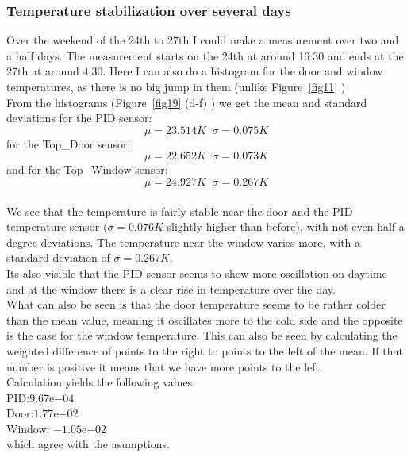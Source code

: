 \documentclass[12pt]{scrartcl}
\begin{document}
      \subsubsection{Temperature stabilization over several days}
      Over the weekend of the 24th to 27th I could make a measurement over two
      and a half days. The measurement starts on the 24th at around 16:30 and
      ends at the 27th at around 4:30. Here I can also do a histogram for the
      door and window temperatures, as there is no big jump in them (unlike
      Figure~\ref{fig11} )\\
      From the histograms (Figure~\ref{fig19} (d-f) ) we get the mean and standard deviations for the PID
      sensor: $$\mu = 23.514K \;\; \sigma = 0.075K$$
      for the Top\_Door sensor: $$\mu = 22.652K \;\; \sigma = 0.073K$$
      and for the Top\_Window sensor: $$\mu = 24.927K \;\; \sigma = 0.267K$$ \\
      We see that the temperature is fairly stable near the door and the PID
      temperature sensor ($\sigma = 0.076 K$ slightly higher than before), with
      not even half a degree deviations. The temperature near the window varies
      more, with a standard deviation of $\sigma = 0.267K$.\\
      Its also visible that the PID sensor seems to show more oscillation on
      daytime and at the window there is a clear rise in temperature over the day.
      \\What can also be seen is that the door temperature seems to be rather
      colder than the mean value, meaning it oscillates more to the cold side
      and the opposite is the case for the window temperature. This can also be
      seen by calculating the weighted difference of points to the right to
      points to the left of the mean. If that number is positive it means that
      we have more points to the left. \\
      Calculation yields the following values: \\
      PID:\hspace{36pt}$9.67\mathrm{e}{-04}$\\
      Door:\hspace{30pt}$1.77\mathrm{e}{-02}$\\
      Window: $-1.05\mathrm{e}{-02}$\\
      which agree with the asumptions.
\end{document}
